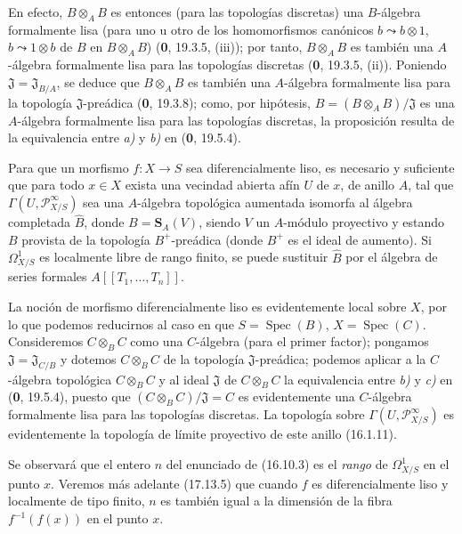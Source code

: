 En efecto, $B\otimes_A B$ es entonces (para las topologías discretas) una
$B$-álgebra formalmente lisa (para uno u otro de los homomorfismos
canónicos $b\leadsto b\otimes1$, $b\leadsto1\otimes b$ de $B$
en $B\otimes_A B$) (\textbf 0, 19.3.5, (iii)); por tanto, $B\otimes_A B$ es también
una $A$-álgebra formalmente lisa para las topologías discretas (\textbf 0, 19.3.5,
(ii)). Poniendo $\mathfrak J=\mathfrak J_{B/A}$, se deduce que
$B\otimes_A B$ es también una $A$-álgebra formalmente lisa para la topología
$\mathfrak J$-preádica (\textbf 0, 19.3.8); como, por hipótesis,
$B=(B\otimes_A B)/\mathfrak J$ es una $A$-álgebra formalmente lisa para
las topologías discretas, la proposición resulta de la equivalencia entre \emph{a)}
y \emph{b)} en (\textbf 0, 19.5.4).

\begin{proposition}[16.10.3]
\label{IV.16.10.3}
Para que un morfismo $f:X\to S$ sea diferencialmente liso, es necesario y
suficiente que para todo $x\in X$ exista una vecindad abierta afín $U$ de
$x$, de anillo $A$, tal que $\Gamma(U,\mathscr{P}_{X/S}^{\infty})$ sea una
$A$-álgebra topológica aumentada isomorfa al álgebra completada $\widehat B$,
donde $B=\mathbf{S}_A(V)$, siendo $V$ un $A$-módulo proyectivo y estando
$B$ provista de la topología $B^+$-preádica (donde $B^+$ es el ideal de aumento). Si
$\varOmega_{X/S}^1$ es localmente libre de rango finito, se puede sustituir
$\widehat B$ por el álgebra de series formales $A[[T_1,\ldots,T_n]]$.
\end{proposition}

La noción de morfismo diferencialmente liso es evidentemente local sobre
$X$, por lo que podemos reducirnos al caso en que $S=\operatorname{Spec}(B)$,
$X=\operatorname{Spec}(C)$. Consideremos $C\otimes_B C$ como una $C$-álgebra
(para el primer factor); pongamos $\mathfrak J=\mathfrak J_{C/B}$ y
dotemos $C\otimes_B C$ de la topología $\mathfrak J$-preádica; podemos
aplicar a la $C$-álgebra topológica $C\otimes_B C$ y al ideal
$\mathfrak J$ de $C\otimes_B C$ la equivalencia entre \emph{b)} y \emph{c)} en (\textbf 0, 19.5.4),
puesto que $(C\otimes_B C)/\mathfrak J=C$ es evidentemente una $C$-álgebra
formalmente lisa para las topologías discretas. La topología sobre
$\Gamma(U,\mathscr{P}_{X/S}^{\infty})$ es evidentemente la topología de límite
proyectivo de este anillo (16.1.11).

Se observará que el entero $n$ del enunciado de (16.10.3) es el \emph{rango} de
$\varOmega_{X/S}^1$ en el punto $x$. Veremos más adelante (17.13.5) que cuando
$f$ es diferencialmente liso y localmente de tipo finito, $n$ es también
igual a la dimensión de la fibra $f^{-1}(f(x))$ en el punto $x$.

